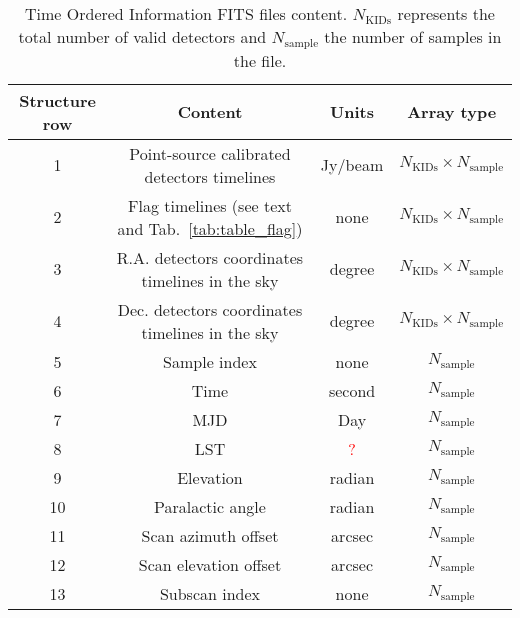 \documentclass[a4paper,10pt]{article}
\begin{document}
	\begin{table}[ht]
	\begin{center}
	\begin{tabular}{|c|c|c|c|}
	 \hline
	Structure row & Content & Units & Array type \\
	\hline
	1 &  Point-source calibrated detectors timelines & Jy/beam & $N_{\mathrm{KIDs}} \times N_{\mathrm{sample}}$ \\
	2 & Flag timelines (see text and Tab.~\ref{tab:table_flag}) & none & $N_{\mathrm{KIDs}} \times N_{\mathrm{sample}}$ \\
	3 &  R.A. detectors coordinates timelines in the sky & degree & $N_{\mathrm{KIDs}} \times N_{\mathrm{sample}}$ \\
	4 &  Dec. detectors coordinates timelines in the sky & degree & $N_{\mathrm{KIDs}} \times N_{\mathrm{sample}}$ \\
	5 & Sample index & none & $N_{\mathrm{sample}}$ \\
	6 & Time & second & $N_{\mathrm{sample}}$ \\
	7 & MJD & Day & $N_{\mathrm{sample}}$ \\
	8 & LST & \textcolor{red}{?} & $N_{\mathrm{sample}}$ \\
	9 & Elevation & radian & $N_{\mathrm{sample}}$ \\
	10 & Paralactic angle & radian & $N_{\mathrm{sample}}$ \\
	11 & Scan azimuth offset & arcsec & $N_{\mathrm{sample}}$ \\
	12 & Scan elevation offset & arcsec & $N_{\mathrm{sample}}$ \\
	13 & Subscan index & none & $N_{\mathrm{sample}}$ \\
	\hline
	\end{tabular}
	\end{center}
	\caption{Time Ordered Information FITS files content.  $N_{\mathrm{KIDs}}$ represents the total number of valid detectors and
	$N_{\mathrm{sample}}$ the number of samples in the file.}
	\label{tab:table_toi}
	\end{table}
	
	
	
\end{document}
